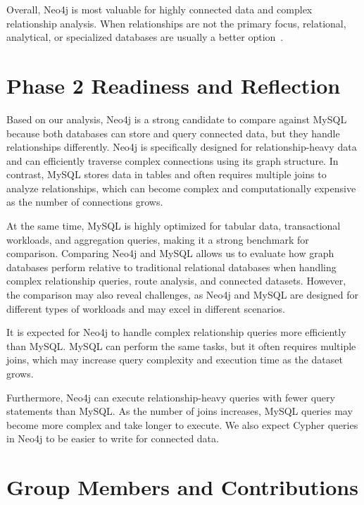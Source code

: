 \documentclass[11pt,a4paper]{article}
\begin{document}
Overall, Neo4j is most valuable for highly connected data and complex relationship analysis. When relationships are not the primary focus, relational, analytical, or specialized databases are usually a better option~\cite{mussin2025performance}.

\section{Phase 2 Readiness and Reflection}

Based on our analysis, Neo4j is a strong candidate to compare against MySQL because both databases can store and query connected data, but they handle relationships differently. Neo4j is specifically designed for relationship-heavy data and can efficiently traverse complex connections using its graph structure. In contrast, MySQL stores data in tables and often requires multiple joins to analyze relationships, which can become complex and computationally expensive as the number of connections grows.

At the same time, MySQL is highly optimized for tabular data, transactional workloads, and aggregation queries, making it a strong benchmark for comparison. Comparing Neo4j and MySQL allows us to evaluate how graph databases perform relative to traditional relational databases when handling complex relationship queries, route analysis, and connected datasets. However, the comparison may also reveal challenges, as Neo4j and MySQL are designed for different types of workloads and may excel in different scenarios.

It is expected for Neo4j to handle complex relationship queries more efficiently than MySQL. MySQL can perform the same tasks, but it often requires multiple joins, which may increase query complexity and execution time as the dataset grows.

Furthermore, Neo4j can execute relationship-heavy queries with fewer query statements than MySQL. As the number of joins increases, MySQL queries may become more complex and take longer to execute. We also expect Cypher queries in Neo4j to be easier to write for connected data.

\section{Group Members and Contributions}
\end{document}

